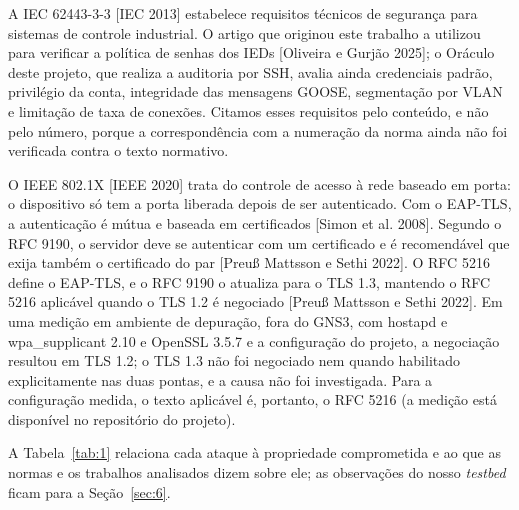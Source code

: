 \documentclass[12pt]{article}
\newcommand{\cit}[2]{[#1]\nocite{#2}}
\begin{document}
A IEC 62443-3-3 \cit{IEC 2013}{iec62443-3-3} estabelece requisitos técnicos de segurança para sistemas de controle industrial. O artigo que originou este trabalho a utilizou para verificar a política de senhas dos IEDs \cit{Oliveira e Gurjão 2025}{oliveira2025analisador}; o Oráculo deste projeto, que realiza a auditoria por SSH, avalia ainda credenciais padrão, privilégio da conta, integridade das mensagens GOOSE, segmentação por VLAN e limitação de taxa de conexões. Citamos esses requisitos pelo conteúdo, e não pelo número, porque a correspondência com a numeração da norma ainda não foi verificada contra o texto normativo.

O IEEE 802.1X \cit{IEEE 2020}{ieee8021x} trata do controle de acesso à rede baseado em porta: o dispositivo só tem a porta liberada depois de ser autenticado. Com o EAP-TLS, a autenticação é mútua e baseada em certificados \cit{Simon et al. 2008}{rfc5216}. Segundo o RFC 9190, o servidor deve se autenticar com um certificado e é recomendável que exija também o certificado do par \cit{Preuß Mattsson e Sethi 2022}{rfc9190}. O RFC 5216 define o EAP-TLS, e o RFC 9190 o atualiza para o TLS 1.3, mantendo o RFC 5216 aplicável quando o TLS 1.2 é negociado \cit{Preuß Mattsson e Sethi 2022}{rfc9190}. Em uma medição em ambiente de depuração, fora do GNS3, com hostapd e wpa\_\allowbreak{}supplicant 2.10 e OpenSSL 3.5.7 e a configuração do projeto, a negociação resultou em TLS 1.2; o TLS 1.3 não foi negociado nem quando habilitado explicitamente nas duas pontas, e a causa não foi investigada. Para a configuração medida, o texto aplicável é, portanto, o RFC 5216 (a medição está disponível no repositório do projeto).

A Tabela~\ref{tab:1} relaciona cada ataque à propriedade comprometida e ao que as normas e os trabalhos analisados dizem sobre ele; as observações do nosso \emph{testbed} ficam para a Seção~\ref{sec:6}.
\end{document}
